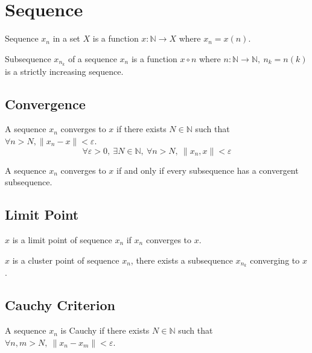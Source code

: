 \section{Sequence}
\begin{definition}
	Sequence $x_n$ in a set $X$ is a function $x : \mathbb{N} \to X$ where $x_n = x(n)$.
\end{definition}

\begin{definition}
	Subsequence $x_{n_k}$ of a sequence $x_n$ is a function $x \circ n$ where $n : \mathbb{N}\to \mathbb{N},\ n_k = n(k)$ is a strictly increasing sequence.
\end{definition}

\subsection{Convergence}
\begin{definition}[norm]
	A sequence $x_n$ converges to $x$ if there exists $N \in \mathbb{N}$ such that $\forall n > N, \|x_n-x\| < \varepsilon$.
\begin{equation}
	\forall \varepsilon > 0,\ \exists N \in \mathbb{N},\ \forall n > N,\ \|x_n,x\| < \varepsilon
\end{equation}
\end{definition}

\begin{remark}[subsequence]
	A sequence $x_n$ converges to $x$ if and only if every subsequence has a convergent subsequence.
\end{remark}

\subsection{Limit Point}
\begin{definition}
	$x$ is a limit point of sequence $x_n$ if $x_n$ converges to $x$.
\end{definition}

\begin{definition}
	$x$ is a cluster point of sequence $x_n$, there exists a subsequence $x_{n_k}$ converging to $x$.
\end{definition}

\subsection{Cauchy Criterion}
\begin{definition}[norm]
	A sequence $x_n$ is Cauchy if there exists $N \in \mathbb{N}$ such that $\forall n,m >N,\ \|x_n-x_m\| < \varepsilon$.
\end{definition}

